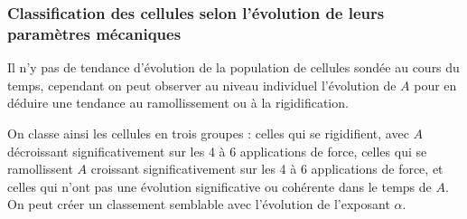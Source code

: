 \documentclass{report}
\begin{document}
\subsubsection{Classification des cellules selon l'évolution de leurs paramètres mécaniques}

Il n'y pas de tendance d'évolution de la population de cellules sondée au cours du temps, cependant on peut observer au niveau individuel l'évolution de $A$ pour en déduire une tendance au ramollissement ou à la rigidification. 

On classe ainsi les cellules en trois groupes : celles qui se rigidifient, avec $A$ décroissant significativement sur les 4 à 6 applications de force, celles qui se ramollissent $A$ croissant significativement sur les 4 à 6 applications de force, et celles qui n'ont pas une évolution significative ou cohérente dans le temps de $A$. 
On peut créer un classement semblable avec l'évolution de l'exposant $\alpha$. 
\end{document}
